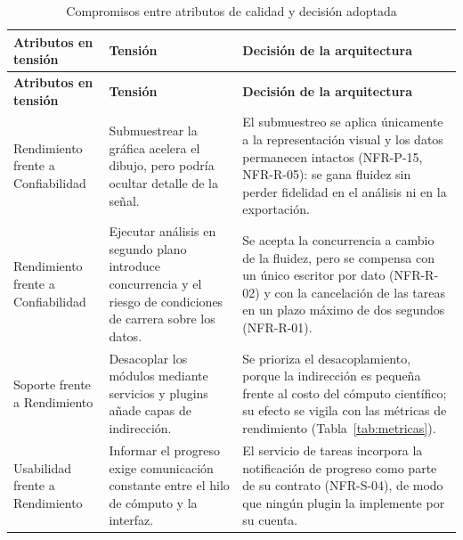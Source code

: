 \documentclass[11pt,a4paper]{article}
\DeclareRobustCommand{\_}{\textunderscore\allowbreak}
\begin{document}
\begin{longtable}{@{}>{\raggedright\arraybackslash}p{3.0cm}
                  >{\raggedright\arraybackslash}p{4.9cm}
                  >{\raggedright\arraybackslash}p{6.8cm}@{}}

\caption{Compromisos entre atributos de calidad y decisión adoptada} \label{tab:compromisos} \\
\toprule
\textbf{Atributos en tensión} &
\textbf{Tensión} &
\textbf{Decisión de la arquitectura} \\
\midrule
\endfirsthead

\toprule
\textbf{Atributos en tensión} &
\textbf{Tensión} &
\textbf{Decisión de la arquitectura} \\
\midrule
\endhead

\bottomrule
\endlastfoot

Rendimiento frente a Confiabilidad
&
Submuestrear la gráfica acelera el dibujo, pero podría ocultar detalle de la señal.
&
El submuestreo se aplica únicamente a la representación visual y los datos permanecen intactos (NFR-P-15, NFR-R-05): se gana fluidez sin perder fidelidad en el análisis ni en la exportación.
\\[0.2cm]

Rendimiento frente a Confiabilidad
&
Ejecutar análisis en segundo plano introduce concurrencia y el riesgo de condiciones de carrera sobre los datos.
&
Se acepta la concurrencia a cambio de la fluidez, pero se compensa con un único escritor por dato (NFR-R-02) y con la cancelación de las tareas en un plazo máximo de dos segundos (NFR-R-01).
\\[0.2cm]

Soporte frente a Rendimiento
&
Desacoplar los módulos mediante servicios y plugins añade capas de indirección.
&
Se prioriza el desacoplamiento, porque la indirección es pequeña frente al costo del cómputo científico; su efecto se vigila con las métricas de rendimiento (Tabla~\ref{tab:metricas}).
\\[0.2cm]

Usabilidad frente a Rendimiento
&
Informar el progreso exige comunicación constante entre el hilo de cómputo y la interfaz.
&
El servicio de tareas incorpora la notificación de progreso como parte de su contrato (NFR-S-04), de modo que ningún plugin la implemente por su cuenta.
\\

\end{longtable}

\end{document}

